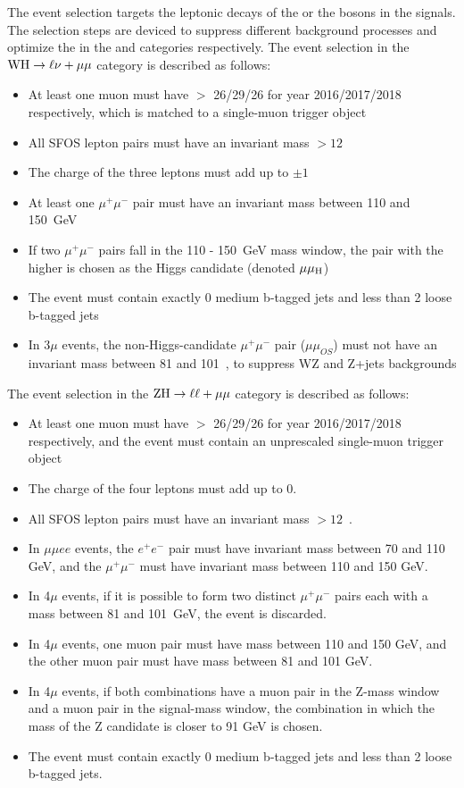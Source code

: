 The event selection targets the leptonic decays of the \PW or the \PZ bosons in the \VH signals.
The selection steps are deviced to suppress different background processes 
and optimize the \SoB in the \WH and \ZH categories respectively. 
The event selection in the $\mathrm{W}\mathrm{H} \to \ell\nu+\mu\mu$ category is described as follows:
\begin{itemize}
	\item At least one muon must have \pt $>$ 26\GeV /29\GeV /26\GeV 
	      for year 2016/2017/2018 respectively, which is matched to a
              single-muon trigger object
	\item All SFOS lepton pairs must have an invariant mass $> 12$~\GeV
	\item The charge of the three leptons must add up to $\pm 1$
	\item At least one $\mu^{+}\mu^{-}$ pair must have an invariant mass between 110
	      and 150~GeV
	\item If two $\mu^{+}\mu^{-}$ pairs fall in the 110 - 150~GeV mass window, the pair
	      with the higher \pt is chosen as the Higgs candidate (denoted $\mu\mu_{\mathrm{H}}$)
	\item The event must contain exactly 0 medium b-tagged jets and less than 2 loose b-tagged jets
	\item In 3$\mu$ events, the non-Higgs-candidate $\mu^{+}\mu^{-}$ pair ($\mu\mu_{OS}$) must
	      not have an invariant mass between 81 and 101~\GeV, to suppress WZ and Z+jets backgrounds
\end{itemize}
The event selection in the $\mathrm{Z}\mathrm{H} \to \ell\ell + \mu\mu$ category is described as follows:
\begin{itemize}
	\item At least one muon must have \pt $>$ 26\GeV /29\GeV /26\GeV 
	      for year 2016/2017/2018 respectively, and the event must
	      contain an unprescaled single-muon trigger object
	\item The charge of the four leptons must add up to 0.
	\item All SFOS lepton pairs must have an invariant mass $> 12$~\GeV.
	\item In $\mu\mu ee$ events, the $e^{+}e^{-}$ pair must have invariant mass between 70 and 110 GeV, and the $\mu^{+}\mu^{-}$ must have invariant mass between 110 and 150 GeV.
	\item In 4$\mu$ events, if it is possible to form two distinct $\mu^{+}\mu^{-}$ pairs
          each with a mass between 81 and 101~GeV, the event is discarded.
	\item In 4$\mu$ events, one muon pair must have mass between 110 and 150 GeV, and the other muon pair must have mass between 81 and 101 GeV.
	\item In 4$\mu$ events, if both combinations have a muon pair in the Z-mass window and a muon pair in the signal-mass window, the combination in which the mass of the Z candidate is closer to 91 GeV is chosen. 
	\item The event must contain exactly 0 medium b-tagged jets and less than 2 loose b-tagged jets.    
\end{itemize}
